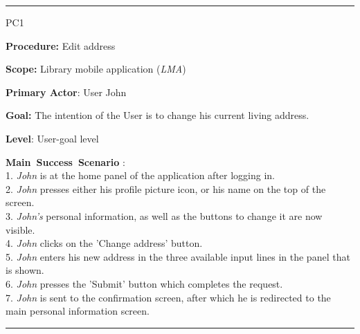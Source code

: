 \vspace{0.5cm}
\hrule
\begin{lyxlist}{PC1}
\small{
\item [\textbf{Procedure:}] Edit address
\item [\textbf{Scope:}] Library mobile application (\emph{LMA})
\item [\textbf{Primary Actor}:] User John
\item [\textbf{Goal:}] The intention of the User is to change his current living
address.
\item [\textbf{Level}:] User-goal level
\item [\textbf{Main~Success~Scenario}]:\\
1. \emph{John} is at the home panel of the application after logging in.\\
2. \emph{John} presses either his profile picture icon, or his name on the
top of the screen.\\
3. \emph{John's} personal information, as well as the buttons to change it are
now visible.\\
4. \emph{John} clicks on the 'Change address' button.\\
5. \emph{John} enters his new address in the three available input lines in the
panel that is shown. \\
6. \emph{John} presses the 'Submit' button which completes the request.  \\
7. \emph{John} is sent to the confirmation screen, after which he is redirected
to the main personal information screen. \\

}

\end{lyxlist}
\hrule



